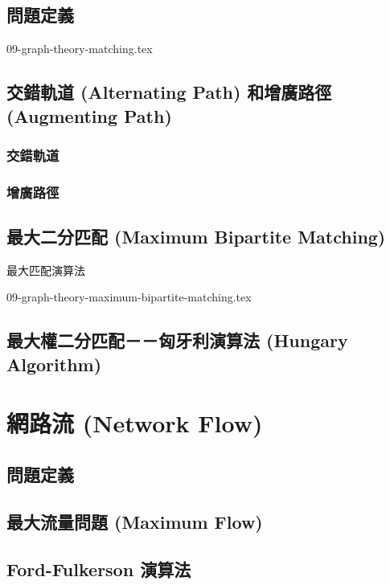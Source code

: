 \documentclass[12pt,a4paper,oneside]{report}
\begin{document}
\begin{CJK}{UTF8}{bkai}
\subsection{問題定義}

{09-graph-theory-matching.tex}

\subsection{交錯軌道 (Alternating Path) 和增廣路徑 (Augmenting Path)}

\subsubsection{交錯軌道}

\subsubsection{增廣路徑}

\subsection{最大二分匹配 (Maximum Bipartite Matching)}

\begin{algorithm}
\caption{最大匹配演算法}
\end{algorithm}

{09-graph-theory-maximum-bipartite-matching.tex}

\subsection{最大權二分匹配－－匈牙利演算法 (Hungary Algorithm)}

\section{網路流 (Network Flow)}
\subsection{問題定義}
\subsection{最大流量問題 (Maximum Flow)}
\subsection{Ford-Fulkerson 演算法}

\end{CJK}
\end{document}
